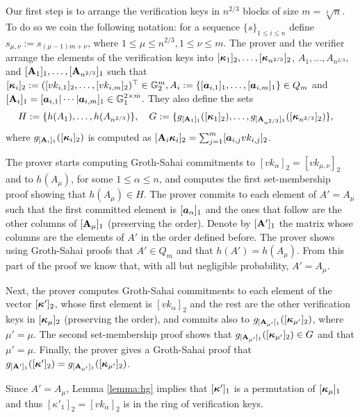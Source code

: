 Our first step is to arrange the verification keys in $n^{2/3}$ blocks of size $m=\sqrt[3]{n}$. To do so we coin the following notation: for a sequence $\{s\}_{1\leq i \leq n}$ define $s_{\mu,\nu}:=s_{(\mu-1)m+\nu}$, where  $1\leq\mu\leq n^{2/3},1\leq \nu\leq m$.  The prover and the verifier arrange the elements of the verification keys into $[{\boldsymbol{\kappa}}_1]_2,\ldots, [{\boldsymbol{\kappa}}_{n^{2/3}}]_2$, $A_1,\ldots, A_{n^{2/3}}$, and $[\mathbf{{A}}_1]_1,\ldots, [\mathbf{{A}}_{n^{2/3}}]_1$ such that $[{\boldsymbol{\kappa}}_i]_2:= ([vk_{i,1}]_2,\ldots,[vk_{i,m}]_2)^\top\in\mathbb{G}^m_2, A_i:=\{[{\boldsymbol{a}}_{i,1}]_1,\ldots,[{\boldsymbol{a}}_{i,m}]_1\}\in Q_m$ and $[\mathbf{{A}}_i]_1=[{\boldsymbol{a}}_{i,1}|\cdots|{\boldsymbol{a}}_{i,m}]_1\in\mathbb{G}^{2\times m}_1$. They also define the sets
\begin{align*}
&H:=\{h(A_1),\ldots,\allowbreak h(A_{n^{2/3}})\},\quad G:=\{g_{[\mathbf{{A}}_1]_1}([{\boldsymbol{\kappa}}_1]_2),\allowbreak\ldots,g_{[\mathbf{{A}}_{n^{2/3}}]_1}([{\boldsymbol{\kappa}}_{n^{2/3}}]_2)\},
\end{align*}
where $g_{[\mathbf{{A}}_i]_1}([{\boldsymbol{\kappa}}_i]_2)$ is computed as $[\mathbf{{A}}_i{\boldsymbol{\kappa}}_i]_2=\sum_{j=1}^m [{\boldsymbol{a}}_{i,j}vk_{i,j}]_2$.

The prover starts computing Groth-Sahai commitments to $[vk_\alpha]_2=[vk_{\mu,\nu}]_2$ and to $h(A_\mu)$, for some $1\leq \alpha \leq n$, and computes the first set-membership proof showing that $h(A_\mu)\in H$.
The prover commits to each element of $A'=A_\mu$ such that the first committed element is $[{\boldsymbol{a}}_\alpha]_1$ and the ones that follow are the other columns of $[\mathbf{{A}}_\mu]_1$ (preserving the order). Denote by $[\mathbf{{A}}']_1$ the matrix whose columns are the elements of $A'$ in the order defined before.  The prover shows using Groth-Sahai proofs that $A'\in Q_m$ and that $h(A')=h(A_\mu)$. From this part of the proof we know that, with all but negligible probability, $A'=A_\mu$.

Next, the prover computes Groth-Sahai commitments to each element of the vector $[{\boldsymbol{\kappa}}']_2$, whose first element is $[vk_\alpha]_2$ and the rest are the other verification keys in $[{\boldsymbol{\kappa}}_\mu]_2$ (preserving the order), and commits also to $g_{[\mathbf{{A_{\mu'}}}]_1}([{\boldsymbol{\kappa}}_{\mu'}]_2)$, where $\mu'=\mu$. The second set-membership proof shows that $g_{[\mathbf{{A_{\mu'}}}]_1}([{\boldsymbol{\kappa}}_{\mu'}]_2)\in G$ and that $\mu'=\mu$. Finally, the prover gives a Groth-Sahai proof that $g_{[\mathbf{{A}}']_1}([{\boldsymbol{\kappa}}']_2)=g_{[\mathbf{{A_{\mu'}}}]_1}([{\boldsymbol{\kappa}}_{\mu'}]_2)$.

Since $A'=A_\mu$, Lemma \ref{lemma:hg} implies that $[{\boldsymbol{\kappa}}']_1$ is a permutation of $[{\boldsymbol{\kappa}}_\mu]_1$ and thus $[\kappa'_1]_2=[vk_\alpha]_2$ is in the ring of verification keys.